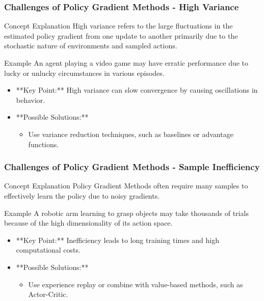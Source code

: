 \documentclass{beamer}
\begin{document}
\begin{frame}[fragile]
    \frametitle{Challenges of Policy Gradient Methods - High Variance}
    \begin{block}{Concept Explanation}
        High variance refers to the large fluctuations in the estimated policy gradient from one update to another primarily due to the stochastic nature of environments and sampled actions.
    \end{block}
    
    \begin{block}{Example}
        An agent playing a video game may have erratic performance due to lucky or unlucky circumstances in various episodes.
    \end{block}
    
    \begin{itemize}
        \item **Key Point:** High variance can slow convergence by causing oscillations in behavior.
        \item **Possible Solutions:** 
        \begin{itemize}
            \item Use variance reduction techniques, such as baselines or advantage functions.
        \end{itemize}
    \end{itemize}
\end{frame}

\begin{frame}[fragile]
    \frametitle{Challenges of Policy Gradient Methods - Sample Inefficiency}
    \begin{block}{Concept Explanation}
        Policy Gradient Methods often require many samples to effectively learn the policy due to noisy gradients.
    \end{block}
    
    \begin{block}{Example}
        A robotic arm learning to grasp objects may take thousands of trials because of the high dimensionality of its action space.
    \end{block}
    
    \begin{itemize}
        \item **Key Point:** Inefficiency leads to long training times and high computational costs.
        \item **Possible Solutions:**
        \begin{itemize}
            \item Use experience replay or combine with value-based methods, such as Actor-Critic.
        \end{itemize}
    \end{itemize}
\end{frame}
\end{document}
